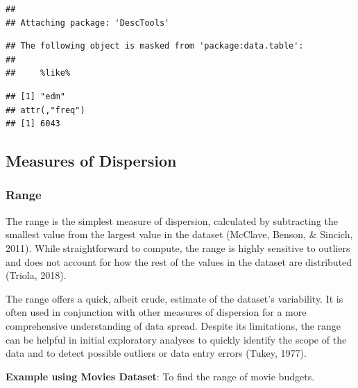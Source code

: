\documentclass[
  b5paper]{book}
\newenvironment{Shaded}{\begin{snugshade}}{\end{snugshade}}
\newcommand{\FunctionTok}[1]{\textcolor[rgb]{0.13,0.29,0.53}{\textbf{#1}}}
\newcommand{\NormalTok}[1]{#1}
\newcommand{\OtherTok}[1]{\textcolor[rgb]{0.56,0.35,0.01}{#1}}
\newcommand{\SpecialCharTok}[1]{\textcolor[rgb]{0.81,0.36,0.00}{\textbf{#1}}}
\begin{document}
\begin{verbatim}
## 
## Attaching package: 'DescTools'
\end{verbatim}

\begin{verbatim}
## The following object is masked from 'package:data.table':
## 
##     %like%
\end{verbatim}

\begin{Shaded}
\end{Shaded}

\begin{verbatim}
## [1] "edm"
## attr(,"freq")
## [1] 6043
\end{verbatim}

\hypertarget{measures-of-dispersion}{%
\subsection*{Measures of Dispersion}\label{measures-of-dispersion}}

\hypertarget{range}{%
\subsubsection*{Range}\label{range}}

The range is the simplest measure of dispersion, calculated by subtracting the smallest value from the largest value in the dataset (McClave, Benson, \& Sincich, 2011). While straightforward to compute, the range is highly sensitive to outliers and does not account for how the rest of the values in the dataset are distributed (Triola, 2018).

The range offers a quick, albeit crude, estimate of the dataset's variability. It is often used in conjunction with other measures of dispersion for a more comprehensive understanding of data spread. Despite its limitations, the range can be helpful in initial exploratory analyses to quickly identify the scope of the data and to detect possible outliers or data entry errors (Tukey, 1977).

\textbf{Example using Movies Dataset}: To find the range of movie budgets.
\end{document}
